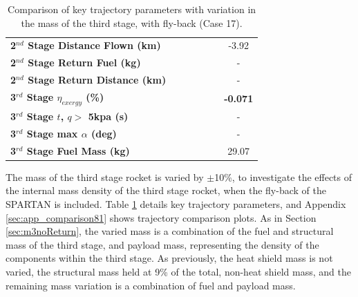 \begin{table}[ht]
\begin{tabular}{l c c c c c c}
		\textbf{2$^{nd}$ Stage Distance Flown (km)}
		& \SecondDistmThreeNinety
		& \SecondDistmThreeNinetyFive
		& \SecondDistmThreeStandard
		& \SecondDistmThreeOneHundredFive
		& \SecondDistmThreeOneHundredTen
		&-3.92
		\\
		\textbf{2$^{nd}$ Stage Return Fuel (kg)}
		& \returnFuelmThreeNinety
		& \returnFuelmThreeNinetyFive
		& \returnFuelmThreeStandard
		& \returnFuelmThreeOneHundredFive
		& \returnFuelmThreeOneHundredTen
		& -
		\\
		\textbf{2$^{nd}$ Stage Return Distance (km)}
		& \returnDistmThreeNinety
		& \returnDistmThreeNinetyFive
		& \returnDistmThreeStandard
		& \returnDistmThreeOneHundredFive
		& \returnDistmThreeOneHundredTen
		& -
		\\
		\hline 
		\textbf{3$^{rd}$ Stage $\eta_{exergy}$ (\%)}
		& \textbf{\thirddExergyEffmThreeNinety}
		& \textbf{\thirddExergyEffmThreeNinetyFive}
		& \textbf{\thirddExergyEffmThreeStandard}
		& \textbf{\thirddExergyEffmThreeOneHundredFive}
		& \textbf{\thirddExergyEffmThreeOneHundredTen}
		& \textbf{-0.071}
		\\
		\textbf{3$^{rd}$ Stage $t$, $q >$ 5kpa (s)}
		& \thirdqOverFivemThreeNinety
		& \thirdqOverFivemThreeNinetyFive
		& \thirdqOverFivemThreeStandard
		& \thirdqOverFivemThreeOneHundredFive
		& \thirdqOverFivemThreeOneHundredTen
		& -
		\\
		\textbf{3$^{rd}$ Stage max $\alpha$ (deg)}
		& \thirdmaxAoAmThreeNinety
		& \thirdmaxAoAmThreeNinetyFive
		& \thirdmaxAoAmThreeStandard
		& \thirdmaxAoAmThreeOneHundredFive
		& \thirdmaxAoAmThreeOneHundredTen
		& -
		\\
		\textbf{3$^{rd}$ Stage Fuel Mass (kg)}
		& \thirdmFuelmThreeNinety
		& \thirdmFuelmThreeNinetyFive
		& \thirdmFuelmThreeStandard
		& \thirdmFuelmThreeOneHundredFive
		& \thirdmFuelmThreeOneHundredTen
		&29.07
		\\
		\hline 
	\end{tabular} 
	\caption{Comparison of key trajectory parameters with variation in the mass of the third stage, with fly-back (Case 17).}
	\label{tab:comparison81}
\end{table}

The mass of the third stage rocket is varied by $\pm$10\%, to investigate the effects of the internal mass density of the third stage rocket, when the fly-back of the SPARTAN is included. Table \ref{tab:comparison81} details key trajectory parameters, and Appendix \ref{sec:app_comparison81} shows trajectory comparison plots. As in Section \ref{sec:m3noReturn}, the varied mass is a combination of the fuel and structural mass of the third stage, and payload mass, representing the density of the components within the third stage. As previously, the heat shield mass is not varied, the structural mass held at 9\% of the total, non-heat shield mass, and the remaining mass variation is a combination of fuel and payload mass.

